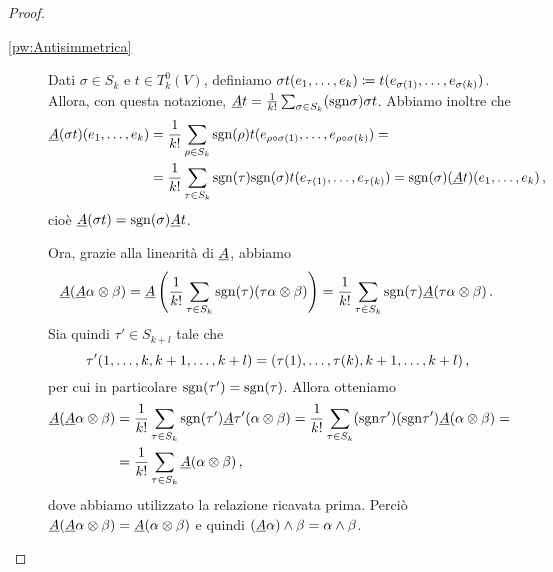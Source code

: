 \begin{proof}
\begin{description}
 \item [\ref{pw:Antisimmetrica}]
	Dati $\sigma \in S_k$ e $t\in T^0_k(V)$, definiamo $\sigma t(\seqb{e}{k}{,}) \coloneqq t(e_{\sigma(1)}, \ldots, e_{\sigma(k)})$. Allora, con questa notazione, $\antisimm t =\frac 1{k!} \sum_{\sigma\in S_k} (\sgn\sigma) \sigma t$.
	Abbiamo inoltre che 
	\begin{align*}
		\antisimm (\sigma t)(\seqb ek,) &= \frac 1{k!} \sum_{\rho \in S_k} \sgn (\rho) t(e_{\rho\circ\sigma (1)},\ldots,e_{\rho\circ\sigma(k)}) =\\
		&= \frac 1{k!} \sum_{\tau\in S_k} \sgn(\tau)\sgn(\sigma) t(e_{\tau(1)}, \ldots, e_{\tau(k)}) = \sgn(\sigma) (\antisimm t)(\seqb{e}{k}{,})\virgola
	\end{align*}
	cioè $\antisimm (\sigma t) = \sgn (\sigma) \antisimm t$.%

	Ora, grazie alla linearità di $\antisimm$, abbiamo
	\begin{equation*}
		\antisimm(\antisimm \alpha \otimes \beta) = \antisimm\left(\frac 1{k!} \sum_{\tau\in S_k} \sgn(\tau) (\tau\alpha \otimes \beta)\right) =
		\frac 1{k!} \sum_{\tau\in S_k}\sgn(\tau) \antisimm(\tau\alpha\otimes \beta)\punto
	\end{equation*}
	Sia quindi $\tau'\in S_{k+l}$ tale che
	\begin{equation*}
		\tau'(1,\ldots,k,k+1,\ldots,k+l) = (\tau(1),\ldots,\tau(k),k+1,\ldots,k+l) \virgola
	\end{equation*}
	per cui in particolare $\sgn(\tau')=\sgn(\tau)$.
	Allora otteniamo 
	\begin{align*}
		\antisimm(\antisimm \alpha \otimes \beta) &= \frac 1{k!} \sum_{\tau\in S_k} \sgn(\tau')\antisimm\tau'(\alpha\otimes \beta)= \frac 1{k!} \sum_{\tau\in S_k} (\sgn\tau')(\sgn\tau')\antisimm(\alpha\otimes \beta)=\\
		&=\frac 1{k!} \sum_{\tau\in S_k} \antisimm(\alpha\otimes \beta)\virgola
	\end{align*}
	dove abbiamo utilizzato la relazione ricavata prima.
	Perciò $\antisimm(\antisimm\alpha\otimes \beta) = \antisimm(\alpha\otimes\beta)$ e quindi $(\antisimm\alpha)\wedge\beta = \alpha\wedge\beta$.
	

\end{description}
\end{proof}
